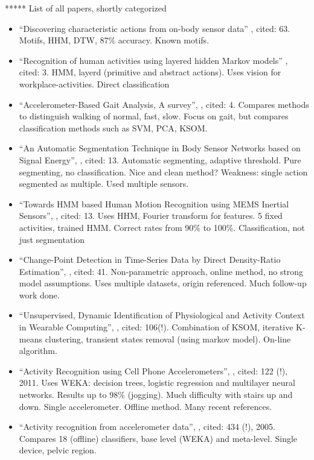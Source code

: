 *****
List of all papers, shortly categorized
\begin{itemize}
  \item ``Discovering characteristic actions from on-body sensor data'' \cite{minnen2006discovering}, cited: 63. Motifs, HHM, DTW, 87\% accuracy. Known motifs.
  \item ``Recognition of human activities using layered hidden Markov models'' \cite{perdikis2008recognition}, cited: 3. HMM, layerd (primitive and abstract actions). Uses vision for workplace-activities. Direct classification
  \item ``Accelerometer-Based Gait Analysis, A survey'', \cite{derawi2010accelerometer}, cited: 4. Compares methods to distinguish walking of normal, fast, slow. Focus on gait, but compares classification methods such as SVM, PCA, KSOM.
  \item ``An Automatic Segmentation Technique in Body Sensor Networks based on Signal Energy'', \cite{guenterberg2009automatic}, cited: 13. Automatic segmenting, adaptive threshold. Pure segmenting, no classification. Nice and clean method? Weakness: single action segmented as multiple. Used multiple sensors.
  \item ``Towards HMM based Human Motion Recognition using MEMS Inertial Sensors'', \cite{shi2009towards}, cited: 13. Uses HHM, Fourier transform for features. 5 fixed activities, trained HMM. Correct rates from 90\% to 100\%. Classification, not just segmentation
  \item ``Change-Point Detection in Time-Series Data by Direct Density-Ratio Estimation'', \cite{kawahara2009change}, cited: 41. Non-parametric approach, online method, no strong model assumptions. Uses multiple datasets, origin referenced. Much follow-up work done.
  \item ``Unsupervised, Dynamic Identification of Physiological and Activity Context in Wearable Computing'', \cite{krause2003unsupervised}, cited: 106(!). Combination of KSOM, iterative K-means clustering, transient states removal (using markov model). On-line algorithm.
  \item ``Activity Recognition using Cell Phone Accelerometers'', \cite{kwapisz2011activity}, cited: 122 (!), 2011. Uses WEKA: decision trees, logistic regression and multilayer neural networks. Results up to 98\% (jogging). Much difficulty with stairs up and down. Single accelerometer. Offline method. Many recent references.
  \item ``Activity recognition from accelerometer data'', \cite{ravi2005activity}, cited: 434 (!), 2005. Compares 18 (offline) classifiers, base level (WEKA) and meta-level. Single device, pelvic region.

\end{itemize}
